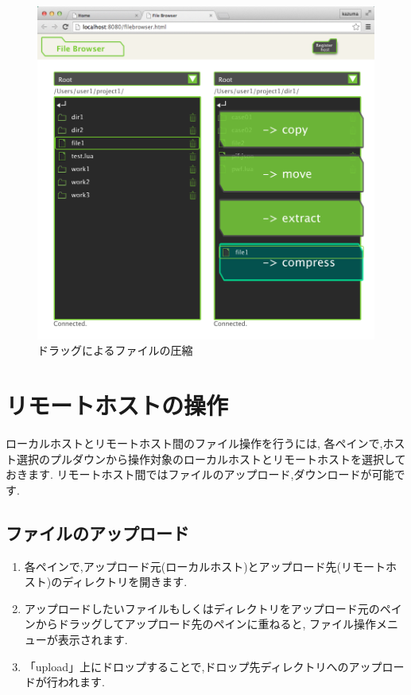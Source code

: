 \documentclass[a4paper,10pt,oneside]{jsbook}
\begin{document}
\begin{figure}[H]
	\begin{center}
		\includegraphics[width=12.0cm]{image/filebrowser_006.png}
	\end{center}
	\caption{ドラッグによるファイルの圧縮}
	\label{fig:filebrowser_filecompress}
\end{figure}

\newpage

\section{リモートホストの操作}
ローカルホストとリモートホスト間のファイル操作を行うには,
各ペインで,ホスト選択のプルダウンから操作対象のローカルホストとリモートホストを選択しておきます.
リモートホスト間ではファイルのアップロード,ダウンロードが可能です.
\subsection{ファイルのアップロード}
\begin{enumerate}
	\item 各ペインで,アップロード元(ローカルホスト)とアップロード先(リモートホスト)のディレクトリを開きます.
	\item アップロードしたいファイルもしくはディレクトリをアップロード元のペインからドラッグしてアップロード先のペインに重ねると,
		  ファイル操作メニューが表示されます.
	\item 「upload」上にドロップすることで,ドロップ先ディレクトリへのアップロードが行われます.
\end{enumerate}
\end{document}
